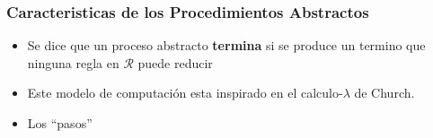 \documentclass{beamer}
\begin{document}
\begin{frame}
\frametitle{Caracteristicas de los Procedimientos Abstractos}
\begin{itemize}
    \item{Se dice que un proceso abstracto {\bf termina} si se produce
    un termino que ninguna regla en $\mathcal{R}$ puede reducir}
    \item{Este modelo de computaci\'on esta inspirado en el
    calculo-$\lambda$ de Church.}
    \item{Los ``pasos'' }
\end{itemize}
\end{frame}
\end{document}
